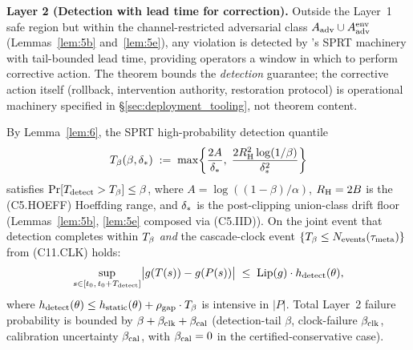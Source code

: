 \begin{theorem}
\medskip\noindent\textbf{Layer 2 (Detection with lead time for
correction).}
Outside the Layer~1 safe region but within the channel-restricted
adversarial class $A_{\mathrm{adv}} \cup A_{\mathrm{adv}}^{\mathrm{env}}$
(Lemmas~\ref{lem:5b} and~\ref{lem:5e}), any violation is detected
by \citep[Exogenous~Verification]{lasser2026exo}'s SPRT machinery
with tail-bounded lead time, providing operators a window in
which to perform corrective action. The theorem bounds the
\emph{detection} guarantee; the corrective action itself
(rollback, intervention authority, restoration protocol) is
operational machinery specified in \S\ref{sec:deployment_tooling},
not theorem content.

By Lemma~\ref{lem:6}, the SPRT high-probability detection quantile
\[
  T_{\beta}(\beta, \delta_{*}) \;:=\;
  \max\!\left\{\frac{2A}{\delta_{*}},\;
  \frac{2 R_{\mathrm{H}}^2 \log(1/\beta)}{\delta_{*}^2}\right\}
\]
satisfies $\Pr[T_{\mathrm{detect}} > T_{\beta}] \leq \beta$, where
$A = \log((1-\beta)/\alpha)$, $R_{\mathrm{H}} = 2B$ is the (C5.HOEFF)
Hoeffding range, and $\delta_{*}$ is the post-clipping union-class
drift floor (Lemmas~\ref{lem:5b}, \ref{lem:5e} composed via (C5.IID)).
On the joint event that detection completes within $T_{\beta}$
\emph{and} the cascade-clock event $\{T_{\beta} \leq
N_{\mathrm{events}}(\tau_{\mathrm{meta}})\}$ from (C11.CLK) holds:
\[
  \sup_{s \in [t_0,\, t_0 + T_{\mathrm{detect}}]}
  \bigl|g(T(s)) - g(P(s))\bigr|
  \;\leq\; \mathrm{Lip}(g) \cdot h_{\mathrm{detect}}(\theta),
\]
where $h_{\mathrm{detect}}(\theta) \leq h_{\mathrm{static}}(\theta)
+ \rho_{\mathrm{gap}} \cdot T_{\beta}$ is intensive in $|P|$.  Total
Layer~2 failure probability is bounded by $\beta + \beta_{\mathrm{clk}} + \beta_{\mathrm{cal}}$
(detection-tail $\beta$, clock-failure $\beta_{\mathrm{clk}}$, calibration
uncertainty $\beta_{\mathrm{cal}}$, with $\beta_{\mathrm{cal}} = 0$ in the certified-conservative
case).


\end{theorem}
